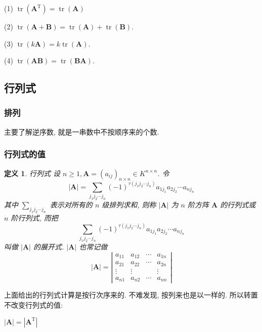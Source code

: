 \documentclass{article}
\newtheorem{mydef}{定义}
\begin{document}
(1) $\operatorname{tr}\left(\boldsymbol{A}^{\mathrm{T}}\right)=\operatorname{tr}(\boldsymbol{A})$

(2) $\operatorname{tr}(\boldsymbol{A}+\boldsymbol{B})=\operatorname{tr}(\boldsymbol{A})+\operatorname{tr}(\boldsymbol{B})$.

(3) $\operatorname{tr}(k \boldsymbol{A})=k \operatorname{tr}(\boldsymbol{A})$.

(4) $\operatorname{tr}(\boldsymbol{A B})=\operatorname{tr}(\boldsymbol{B} \boldsymbol{A})$.

\subsection{行列式}

\subsubsection{排列}
主要了解逆序数, 就是一串数中不按顺序来的个数.

\subsubsection{行列式的值}
\begin{mydef}{行列式}
	设 $n \geq 1, \boldsymbol{A}=\left(a_{i j}\right)_{n \times n} \in K^{n \times n}$. 令
	$$
	|\boldsymbol{A}|=\sum_{j_{1} j_{2} \cdots j_{n}}(-1)^{\tau\left(j_{1} j_{2} \cdots j_{n}\right)} a_{1 j_{1}} a_{2 j_{2}} \cdots a_{n j_{n}}
	$$
	其中 $\sum_{j_{1} j_{2} \cdots j_{n}}$ 表示对所有的 $n$ 级排列求和, 则称 $|\boldsymbol{A}|$ 为 $n$ 阶方阵 $\boldsymbol{A}$ 的行列式或 $n$ 阶行列式, 而把
	$$
	\sum_{j_{1} j_{2} \cdots j_{n}}(-1)^{\tau\left(j_{1} j_{2} \cdots j_{n}\right)} a_{1 j_{1}} a_{2 j_{2}} \cdots a_{n j_{n}}
	$$
	叫做 $|\boldsymbol{A}|$ 的展开式. $|\boldsymbol{A}|$ 也常记做
	$$
	|\boldsymbol{A}|=\left|\begin{array}{cccc}
		a_{11} & a_{12} & \cdots & a_{1 n} \\
		a_{21} & a_{22} & \cdots & a_{2 n} \\
		\vdots & \vdots & & \vdots \\
		a_{n 1} & a_{n 2} & \cdots & a_{n n}
	\end{array}\right|
	$$
\end{mydef}
	上面给出的行列式计算是按行次序来的. 不难发现, 按列来也是以一样的. 所以转置不改变行列式的值:

	\centerline{$\left| \boldsymbol{A}\right| = \left| \boldsymbol{A}^{\mathrm{T}}\right|$}
\end{document}
